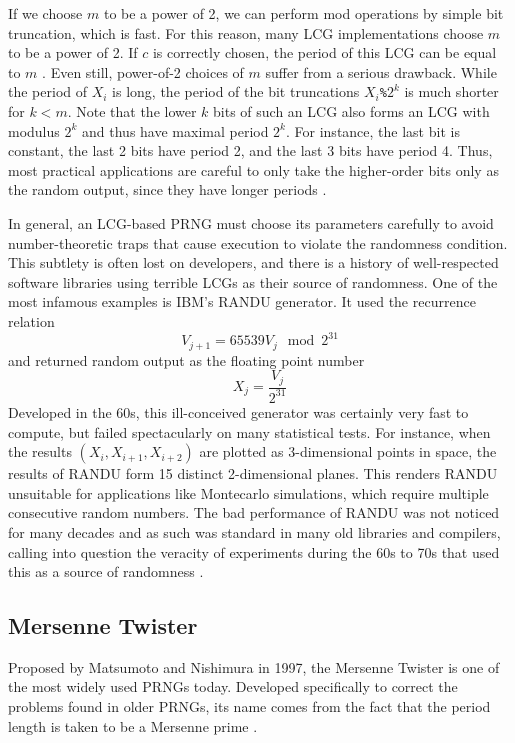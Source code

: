 \documentclass[titlepage]{article}
\theoremstyle{definition}
\begin{document}
If we choose $m$ to be a power of 2, we can perform mod operations by simple bit truncation, which is fast. For this reason, many LCG implementations choose $m$ to be a power of 2. If $c$ is correctly chosen, the period of this LCG can be equal to $m$ \cite{LCG,RNGs}. Even still, power-of-2 choices of $m$ suffer from a serious drawback. While the period of $X_i$ is long, the period of the bit truncations $X_i$\verb|%|$2^k$ is much shorter for $k < m$. Note that the lower $k$ bits of such an LCG also forms an LCG with modulus $2^k$ and thus have maximal period $2^k$. For instance, the last bit is constant, the last 2 bits have period 2, and the last 3 bits have period 4. Thus, most practical applications are careful to only take the higher-order bits only as the random output, since they have longer periods \cite{RNGs}.

In general, an LCG-based PRNG must choose its parameters carefully to avoid number-theoretic traps that cause execution to violate the randomness condition. This subtlety is often lost on developers, and there is a history of well-respected software libraries using terrible LCGs as their source of randomness. One of the most infamous examples is IBM's RANDU generator. It used the recurrence relation
$$V_{j+1} = 65539 V_{j} \!\!\!\mod 2^{31}$$
and returned random output as the floating point number
$$X_j = \frac{V_j}{2^{31}}$$
Developed in the 60s, this ill-conceived generator was certainly very fast to compute, but failed spectacularly on many statistical tests. For instance, when the results $(X_i, X_{i+1}, X_{i+2})$ are plotted as 3-dimensional points in space, the results of RANDU form 15 distinct 2-dimensional planes. This renders RANDU unsuitable for applications like Montecarlo simulations, which require multiple consecutive random numbers. The bad performance of RANDU was not noticed for many decades and as such was standard in many old libraries and compilers, calling into question the veracity of experiments during the 60s to 70s that used this as a source of randomness \cite{Knuth}.

\subsection{Mersenne Twister}
Proposed by Matsumoto and Nishimura in 1997, the Mersenne Twister is one of the most widely used PRNGs today. Developed specifically to correct the problems found in older PRNGs, its name comes from the fact that the period length is taken to be a Mersenne prime \cite{MT}.
\end{document}
